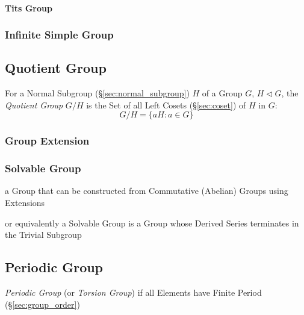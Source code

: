 \paragraph{Tits Group}\label{sec:tits_group}\hfill



\subsubsection{Infinite Simple Group}\label{sec:infinite_simple_group}



\subsection{Quotient Group}\label{sec:quotient_group}

For a Normal Subgroup (\S\ref{sec:normal_subgroup}) $H$ of a Group
$G$, $H \triangleleft G$, the \emph{Quotient Group} $G/H$ is the Set
of all Left Cosets (\S\ref{sec:coset}) of $H$ in $G$:
\[
    G/H = \{ aH : a \in G \}
\]



\subsubsection{Group Extension}\label{sec:group_extension}

\subsubsection{Solvable Group}\label{sec:solvable_group}

a Group that can be constructed from Commutative (Abelian) Groups using
Extensions

or equivalently a Solvable Group is a Group whose Derived Series terminates in
the Trivial Subgroup



\subsection{Periodic Group}\label{sec:periodic_group}

\emph{Periodic Group} (or \emph{Torsion Group}) if all Elements have
Finite Period (\S\ref{sec:group_order})




